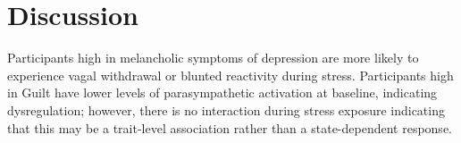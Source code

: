 \documentclass[12pt]{article}
\begin{document}
 \section{Discussion}
Participants high in melancholic symptoms of depression are more likely to experience vagal withdrawal or blunted reactivity during stress. Participants high in Guilt have lower levels of parasympathetic activation at baseline, indicating dysregulation; however, there is no interaction during stress exposure indicating that this may be a trait-level association rather than a state-dependent response. 
\newpage
\printbibliography
\end{document}
